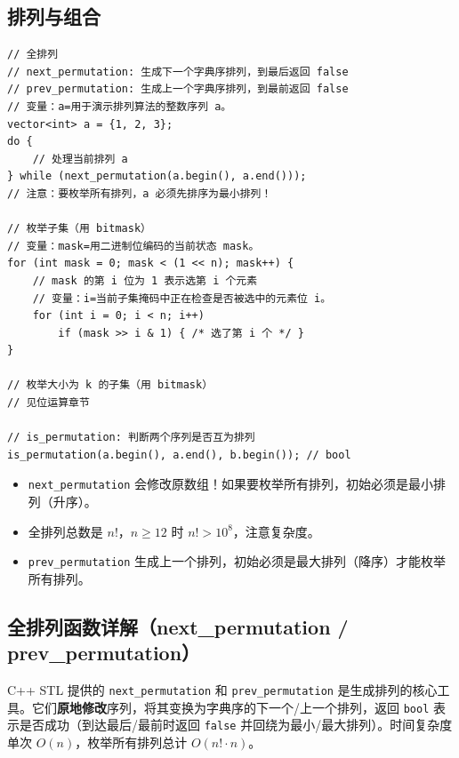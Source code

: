 \documentclass[UTF8,openany,oneside,zihao=-4]{ctexbook}
\begin{document}
\subsection{排列与组合}

\begin{lstlisting}
// 全排列
// next_permutation: 生成下一个字典序排列，到最后返回 false
// prev_permutation: 生成上一个字典序排列，到最前返回 false
// 变量：a=用于演示排列算法的整数序列 a。
vector<int> a = {1, 2, 3};
do {
    // 处理当前排列 a
} while (next_permutation(a.begin(), a.end()));
// 注意：要枚举所有排列，a 必须先排序为最小排列！

// 枚举子集（用 bitmask）
// 变量：mask=用二进制位编码的当前状态 mask。
for (int mask = 0; mask < (1 << n); mask++) {
    // mask 的第 i 位为 1 表示选第 i 个元素
    // 变量：i=当前子集掩码中正在检查是否被选中的元素位 i。
    for (int i = 0; i < n; i++)
        if (mask >> i & 1) { /* 选了第 i 个 */ }
}

// 枚举大小为 k 的子集（用 bitmask）
// 见位运算章节

// is_permutation: 判断两个序列是否互为排列
is_permutation(a.begin(), a.end(), b.begin()); // bool
\end{lstlisting}

\begin{warn}
\begin{itemize}
  \item \lstinline|next_permutation| 会修改原数组！如果要枚举所有排列，初始必须是最小排列（升序）。
  \item 全排列总数是 $n!$，$n \ge 12$ 时 $n! > 10^8$，注意复杂度。
  \item \lstinline|prev_permutation| 生成上一个排列，初始必须是最大排列（降序）才能枚举所有排列。
\end{itemize}
\end{warn}

\subsection{全排列函数详解（next\_permutation / prev\_permutation）}

\begin{note}
C++ STL 提供的 \lstinline|next_permutation| 和 \lstinline|prev_permutation| 是生成排列的核心工具。它们\textbf{原地修改}序列，将其变换为字典序的下一个/上一个排列，返回 \lstinline|bool| 表示是否成功（到达最后/最前时返回 \lstinline|false| 并回绕为最小/最大排列）。时间复杂度单次 $O(n)$，枚举所有排列总计 $O(n! \cdot n)$。
\end{note}
\end{document}
